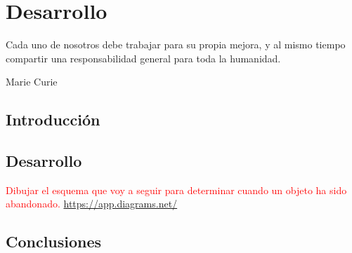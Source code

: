 
\chapter{Desarrollo}
\label{cha:desarrollo}

\begin{FraseCelebre}
  \begin{Frase}
    Cada uno de nosotros debe trabajar para su propia mejora, y al mismo tiempo compartir una responsabilidad general para toda la humanidad.
  \end{Frase}
  \begin{Fuente}
    Marie Curie
  \end{Fuente}
\end{FraseCelebre}

\section{Introducción}
\label{sec:intro-desarrollo}

\newpage

\section{Desarrollo}
\label{sec:desarrollo}

\textcolor{red}{Dibujar el esquema que voy a seguir para determinar cuando un objeto ha sido abandonado.}
\url{https://app.diagrams.net/}

\newpage

\section{Conclusiones}
\label{sec:conclu-desarrollo}